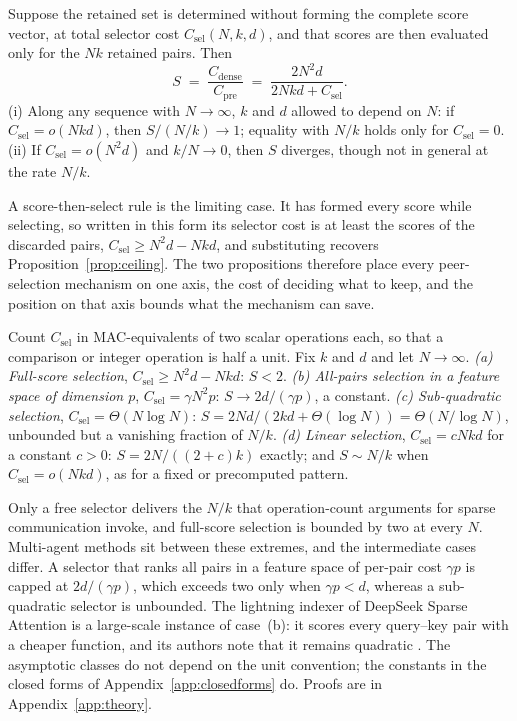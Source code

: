 \begin{proposition}
\label{prop:escape}
Suppose the retained set is determined without forming the complete score
vector, at total selector cost $C_{\mathrm{sel}}(N,k,d)$, and that scores are
then evaluated only for the $Nk$ retained pairs. Then
\begin{equation}
S \;=\; \frac{C_{\text{dense}}}{C_{\mathrm{pre}}}
  \;=\; \frac{2N^2 d}{2Nkd + C_{\mathrm{sel}}}.
\end{equation}
(i) Along any sequence with $N \to \infty$, $k$ and $d$ allowed to depend on
$N$: if $C_{\mathrm{sel}} = o(Nkd)$, then $S/(N/k) \to 1$; equality with $N/k$
holds only for $C_{\mathrm{sel}} = 0$. (ii) If $C_{\mathrm{sel}} = o(N^2 d)$
and $k/N \to 0$, then $S$ diverges, though not in general at the rate $N/k$.
\end{proposition}

A score-then-select rule is the limiting case. It has formed every score while
selecting, so written in this form its selector cost is at least the scores of
the discarded pairs, $C_{\mathrm{sel}} \ge N^2 d - Nkd$, and substituting
recovers Proposition~\ref{prop:ceiling}. The two propositions therefore place
every peer-selection mechanism on one axis, the cost of deciding what to keep,
and the position on that axis bounds what the mechanism can save.

\begin{corollary}
\label{cor:taxonomy}
Count $C_{\mathrm{sel}}$ in MAC-equivalents of two scalar operations each, so
that a comparison or integer operation is half a unit. Fix $k$ and $d$ and let $N \to \infty$.
\emph{(a) Full-score selection}, $C_{\mathrm{sel}} \ge N^2 d - Nkd$: $S < 2$.
\emph{(b) All-pairs selection in a feature space of dimension $p$},
$C_{\mathrm{sel}} = \gamma N^2 p$: $S \to 2d/(\gamma p)$, a constant.
\emph{(c) Sub-quadratic selection}, $C_{\mathrm{sel}} = \Theta(N \log N)$:
$S = 2Nd/(2kd + \Theta(\log N)) = \Theta(N/\log N)$, unbounded but a
vanishing fraction of $N/k$.
\emph{(d) Linear selection}, $C_{\mathrm{sel}} = cNkd$ for a constant $c>0$:
$S = 2N/((2+c)k)$ exactly; and $S \sim N/k$ when $C_{\mathrm{sel}} = o(Nkd)$, as for a
fixed or precomputed pattern.
\end{corollary}

Only a free selector delivers the $N/k$ that operation-count arguments for
sparse communication invoke, and full-score selection is bounded by two at
every $N$. Multi-agent methods sit between these extremes, and the intermediate
cases differ. A selector that ranks all pairs in a feature space of per-pair
cost $\gamma p$ is capped at $2d/(\gamma p)$, which exceeds two only when
$\gamma p < d$, whereas a sub-quadratic selector is unbounded. The lightning
indexer of DeepSeek Sparse Attention is a large-scale instance of
case~(b): it scores every query--key pair with a cheaper function, and its
authors note that it remains quadratic \citep{deepseek2025v32}. The asymptotic
classes do not depend on the unit convention; the constants in the closed forms of
Appendix~\ref{app:closedforms} do. Proofs are in Appendix~\ref{app:theory}.

